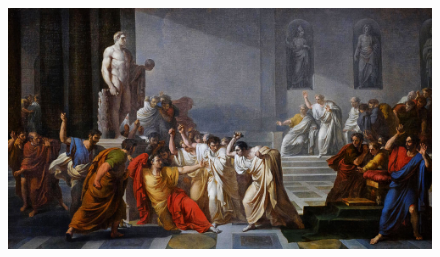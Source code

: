 \begin{figure}[h!tb] 
	\centering\includegraphics[scale=0.4]{ReligionRomeCaesar/1595745699111517977.png}
\end{figure}